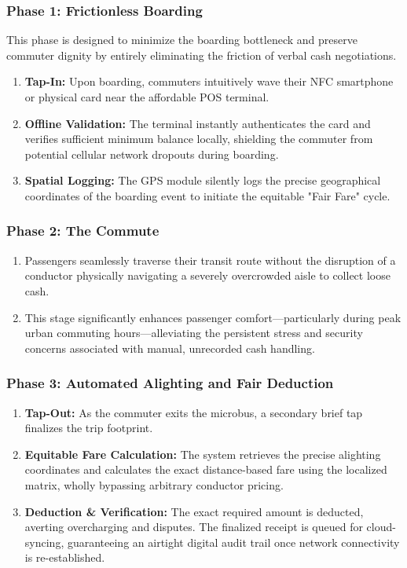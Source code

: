 \documentclass[manuscript,review,anonymous]{acmart}
\begin{document}
\subsubsection{Phase 1: Frictionless Boarding}

This phase is designed to minimize the boarding bottleneck and preserve commuter dignity by entirely eliminating the friction of verbal cash negotiations.

\begin{enumerate}
    \item \textbf{Tap-In:} Upon boarding, commuters intuitively wave their NFC smartphone or physical card near the affordable POS terminal.
    \item \textbf{Offline Validation:} The terminal instantly authenticates the card and verifies sufficient minimum balance locally, shielding the commuter from potential cellular network dropouts during boarding.
    \item \textbf{Spatial Logging:} The GPS module silently logs the precise geographical coordinates of the boarding event to initiate the equitable "Fair Fare" cycle.
\end{enumerate}

\subsubsection{Phase 2: The Commute}

\begin{enumerate}
  \item Passengers seamlessly traverse their transit route without the disruption of a conductor physically navigating a severely overcrowded aisle to collect loose cash.
  \item This stage significantly enhances passenger comfort—particularly during peak urban commuting hours—alleviating the persistent stress and security concerns associated with manual, unrecorded cash handling.
\end{enumerate}

\subsubsection{Phase 3: Automated Alighting and Fair Deduction}
\begin{enumerate}
  \item \textbf{Tap-Out:} As the commuter exits the microbus, a secondary brief tap finalizes the trip footprint.
  \item \textbf{Equitable Fare Calculation:} The system retrieves the precise alighting coordinates and calculates the exact distance-based fare using the localized matrix, wholly bypassing arbitrary conductor pricing.
  \item \textbf{Deduction \& Verification:} The exact required amount is deducted, averting overcharging and disputes. The finalized receipt is queued for cloud-syncing, guaranteeing an airtight digital audit trail once network connectivity is re-established.
\end{enumerate}
\end{document}
